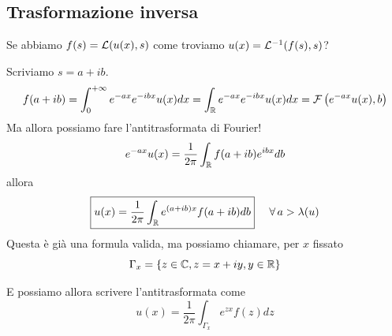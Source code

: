 \subsection{Trasformazione inversa}

Se abbiamo $f(s) = \mathcal{L}(u(x), s)$ come troviamo $u(x) = \mathcal{L}^{- 1}(f(s), s)$?

Scriviamo $s = a + ib$.
\begin{equation*}
f(a + ib) = \int^{+ \infty}_{0} e^{- ax} e^{- ibx} u(x) dx = \int_{\mathbb{R}} e^{- ax} e^{- ibx} u(x) dx = \mathcal{F}\left(e^{- ax} u(x), b\right)
\end{equation*}
Ma allora possiamo fare l'antitrasformata di Fourier!
\begin{equation*}
e^{- ax} u(x) = \frac{1}{2\pi}\int_{\mathbb{R}} f(a + ib) e^{ibx} db
\end{equation*}
allora
\begin{equation*}
\boxed{u(x) = \frac{1}{2\pi}\int_{\RR} e^{(a + ib) x} f(a + ib) db} \ \ \ \ \forall a > \lambda (u)
\end{equation*}
Questa è già una formula valida, ma possiamo chiamare, per $x$ fissato
\begin{equation*}
\Gamma_{x} = \{z\in \mathbb{C}, z = x + iy, y\in \mathbb{R}\}
\end{equation*}

\begin{figure}[htpb]
\centering
{} %

\end{figure}
\FloatBarrier

E possiamo allora scrivere l'antitrasformata come
\begin{equation*}
\boxed{u(x) = \frac{1}{2\pi}\int_{\Gamma_{x}} e^{zx} f(z) dz}
\end{equation*}

